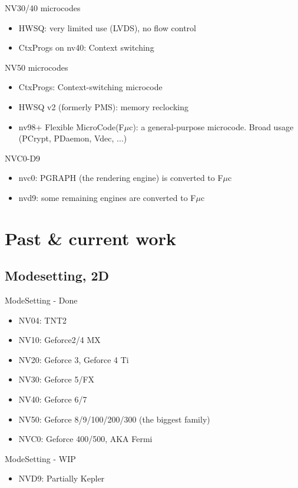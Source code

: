 \documentclass[11pt,english,compress]{beamer}
\begin{document}
		\begin{frame}
			\begin{block}{NV30/40 microcodes}
				\begin{itemize}
					\item HWSQ: very limited use (LVDS), no flow control
					\item CtxProgs on nv40: Context switching
				\end{itemize}
			\end{block}

			\begin{block}{NV50 microcodes}
				\begin{itemize}
					\item CtxProgs: Context-switching microcode
					\item HWSQ v2 (formerly PMS): memory reclocking
					\item nv98+ Flexible MicroCode(F$\mu$c): a general-purpose microcode. Broad usage (PCrypt, PDaemon, Vdec, ...)
				\end{itemize}
			\end{block}

			\begin{block}{NVC0-D9}
				\begin{itemize}
					\item nvc0: PGRAPH (the rendering engine) is converted to F$\mu$c
					\item nvd9: some remaining engines are converted to F$\mu$c
				\end{itemize}
			\end{block}
		\end{frame}

\section{Past \& current work}
	\subsection{Modesetting, 2D}
		\begin{frame}
			\begin{block}{ModeSetting - Done}
				\begin{itemize}
					\item NV04: TNT2
					\item NV10: Geforce2/4 MX
					\item NV20: Geforce 3, Geforce 4 Ti
					\item NV30: Geforce 5/FX
					\item NV40: Geforce 6/7
					\item NV50: Geforce 8/9/100/200/300 (the biggest family)
					\item NVC0: Geforce 400/500, AKA Fermi
				\end{itemize}
			\end{block}

			\begin{block}{ModeSetting - WIP}
				\begin{itemize}
					\item NVD9: Partially Kepler
				\end{itemize}
			\end{block}
		\end{frame}
\end{document}

